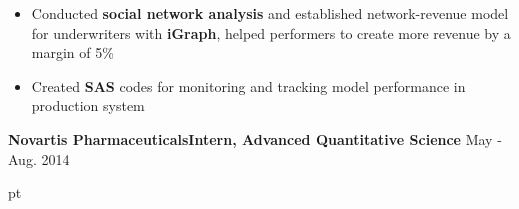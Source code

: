 \documentclass[10.5pt]{res} %
\begin{document}
\begin{resume}
\begin{itemize}
			\item  Conducted \textbf{social network analysis} and established network-revenue model for underwriters with \textbf{iGraph}, helped performers to create more revenue by a margin of 5\%
			\item Created \textbf{SAS} codes for monitoring and tracking model performance in production system
		\end{itemize}\vspace{-\topsep}
	\textbf{Novartis Pharmaceuticals}\quad\quad\quad \textbf{Intern, Advanced Quantitative Science}    \hfill May - Aug. 2014
		\begin{itemize} pt

\end{itemize}
\end{resume}
\end{document}
